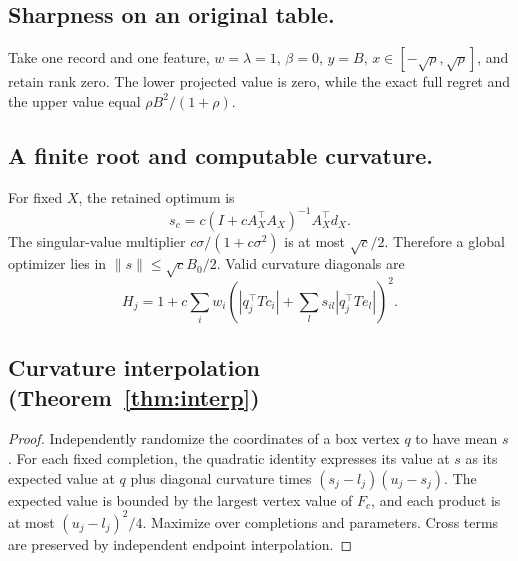 \subsection{Sharpness on an original table.}
Take one record and one feature, $w=\lambda=1$, $\beta=0$, $y=B$, $x\in[-\sqrt{\rho},\sqrt{\rho}]$, and retain rank zero. The lower projected value is zero, while the exact full regret and the upper value equal $\rho B^2/(1+\rho)$.

\subsection{A finite root and computable curvature.}
For fixed $X$, the retained optimum is
\begin{equation}
 s_c=c(I+cA_X^\top A_X)^{-1}A_X^\top d_X.
\end{equation}
The singular-value multiplier $c\sigma/(1+c\sigma^2)$ is at most $\sqrt c/2$. Therefore a global optimizer lies in $\|s\|\leq\sqrt c B_0/2$. Valid curvature diagonals are
\begin{equation}
 H_j=1+c\sum_iw_i\left(|q_j^\top Tc_i|+
                 \sum_l s_{il}|q_j^\top Te_l|\right)^2.\label{eq:curv}
\end{equation}



\subsection{Curvature interpolation (Theorem~\ref{thm:interp})}
\begin{proof}
Independently randomize the coordinates of a box vertex $q$ to have mean $s$. For each fixed completion, the quadratic identity expresses its value at $s$ as its expected value at $q$ plus diagonal curvature times $(s_j-l_j)(u_j-s_j)$. The expected value is bounded by the largest vertex value of $F_c$, and each product is at most $(u_j-l_j)^2/4$. Maximize over completions and parameters. Cross terms are preserved by independent endpoint interpolation.
\end{proof}

